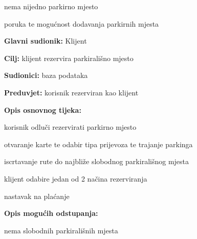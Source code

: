 \begin{packed_item}
\begin{packed_item}
\begin{packed_item}
    						\item[2.a] nema nijedno parkirno mjesto
    						\item[] \begin{packed_enum}
    							
    							\item poruka te mogućnost dodavanja parkirnih mjesta
    							
    						\end{packed_enum}
    						
    					\end{packed_item}
    				\end{packed_item}
    				\noindent {}
    				\begin{packed_item}
    					
    					\item \textbf{Glavni sudionik: } Klijent
    					\item  \textbf{Cilj:} klijent rezervira parkirališno mjesto
    					\item  \textbf{Sudionici:} baza podataka
    					\item  \textbf{Preduvjet:} korisnik rezerviran kao klijent
    					\item  \textbf{Opis osnovnog tijeka:}
    					
    					\item[] \begin{packed_enum}
    						
    						\item korisnik odluči rezervirati parkirno mjesto
    						\item otvaranje karte te odabir tipa prijevoza te trajanje parkinga	
    						\item iscrtavanje rute do najbliže slobodnog parkirališnog mjesta
    						\item klijent odabire jedan od 2 načina rezerviranja
    						\item nastavak na plaćanje
    					\end{packed_enum}
    					
    					\item  \textbf{Opis mogućih odstupanja:}
    					
    					\item[] \begin{packed_item}
    						
    						\item[3.a] nema slobodnih parkirališnih mjesta
    						\item[] \begin{packed_enum}
    							

\end{packed_enum}
\end{packed_item}
\end{packed_item}
\end{packed_item}
